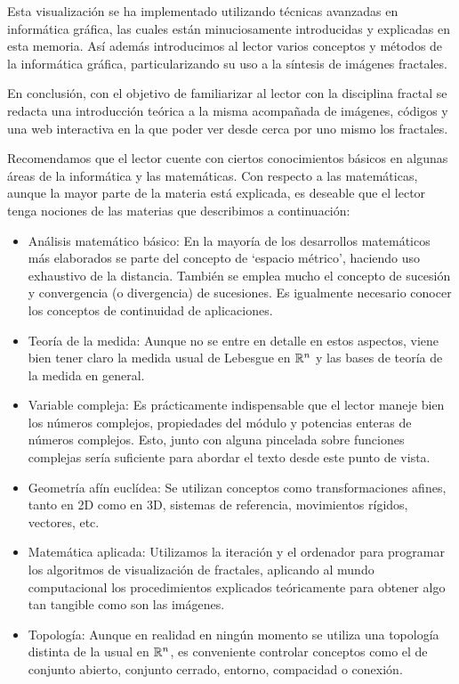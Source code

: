 Esta visualización se ha implementado utilizando técnicas avanzadas en informática gráfica, las cuales están minuciosamente introducidas y explicadas en esta memoria. Así además introducimos al lector varios conceptos y métodos de la informática gráfica, particularizando su uso a la síntesis de imágenes fractales.

En conclusión, con el objetivo de familiarizar al lector con la disciplina fractal se redacta una introducción teórica a la misma acompañada de imágenes, códigos y una web interactiva en la que poder ver desde cerca por uno mismo los fractales.

Recomendamos que el lector cuente con ciertos conocimientos básicos en algunas áreas de la informática y las matemáticas. Con respecto a las matemáticas, aunque la mayor parte de la materia está explicada, es deseable que el lector tenga nociones de las materias que describimos a continuación:

\begin{itemize}
    \item Análisis matemático básico: En la mayoría de los desarrollos matemáticos más elaborados se parte del concepto de `espacio métrico', haciendo uso exhaustivo de la distancia. También se emplea mucho el concepto de sucesión y convergencia (o divergencia) de sucesiones. Es igualmente necesario conocer los conceptos de continuidad de aplicaciones.
    \item Teoría de la medida: Aunque no se entre en detalle en estos aspectos, viene bien tener claro la medida usual de Lebesgue en $\mathbb{R}^n$ y las bases de teoría de la medida en general.
    \item Variable compleja: Es prácticamente indispensable que el lector maneje bien los números complejos, propiedades del módulo y potencias enteras de números complejos. Esto, junto con alguna pincelada sobre funciones complejas sería suficiente para abordar el texto desde este punto de vista.
    \item Geometría afín euclídea: Se utilizan conceptos como transformaciones afines, tanto en 2D como en 3D, sistemas de referencia, movimientos rígidos, vectores, etc.
    \item Matemática aplicada: Utilizamos la iteración y el ordenador para programar los algoritmos de visualización de fractales, aplicando al mundo computacional los procedimientos explicados teóricamente para obtener algo tan tangible como son las imágenes.
    \item Topología: Aunque en realidad en ningún momento se utiliza una topología distinta de la usual en $\mathbb{R}^n$, es conveniente controlar conceptos como el de conjunto abierto, conjunto cerrado, entorno, compacidad o conexión.
\end{itemize}

